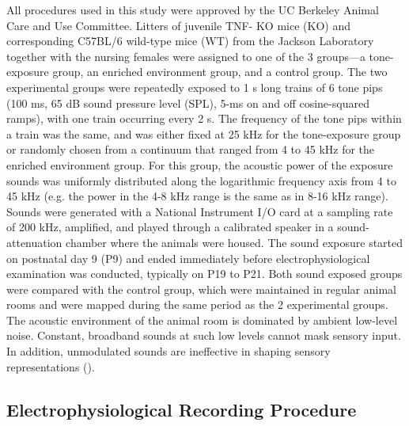 All procedures used in this study were approved by the UC Berkeley Animal Care and Use Committee. Litters of juvenile TNF-\textalpha{} KO mice (KO) and corresponding C57BL/6 wild-type mice (WT) from the Jackson Laboratory together with the nursing females were assigned to one of the 3 groups---a tone-exposure group, an enriched environment group, and a control group. The two experimental groups were repeatedly exposed to 1 s long trains of 6 tone pips (100 ms, 65 dB sound pressure level (SPL), 5-ms on and off cosine-squared ramps), with one train occurring every 2 s. The frequency of the tone pips within a train was the same, and was either fixed at 25 kHz for the tone-exposure group or randomly chosen from a continuum that ranged from 4 to 45 kHz for the enriched environment group. For this group, the acoustic power of the exposure sounds was uniformly distributed along the logarithmic frequency axis from 4 to 45 kHz (e.g. the power in the 4-8 kHz range is the same as in 8-16 kHz range). Sounds were generated with a National Instrument I/O card at a sampling rate of 200 kHz, amplified, and played through a calibrated speaker in a sound-attenuation chamber where the animals were housed. The sound exposure started on postnatal day 9 (P9) and ended immediately before electrophysiological examination was conducted, typically on P19 to P21. Both sound exposed groups were compared with the control group, which were maintained in regular animal rooms and were mapped during the same period as the 2 experimental groups. The acoustic environment of the animal room is dominated by ambient low-level noise. Constant, broadband sounds at such low levels cannot mask sensory input. In addition, unmodulated sounds are ineffective in shaping sensory representations (\cite{Kim2009}).

\subsection{Electrophysiological Recording Procedure}

